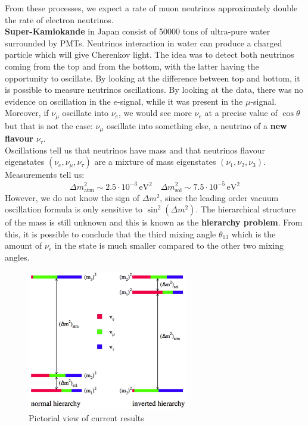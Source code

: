 \documentclass[10.75pt,a4paper,openright,bottom=2cm]{article}
\begin{document}
From these processes, we expect a rate of muon neutrinos approximately double the rate of electron neutrinos.\\
\textbf{Super-Kamiokande} in Japan consist of 50000 tons of ultra-pure water surrounded by PMTs. Neutrinos interaction in water can produce a charged particle which will give Cherenkov light. The idea was to detect both neutrinos coming from the top and from the bottom, with the latter having the opportunity to oscillate. By looking at the difference between top and bottom, it is possible to measure neutrinos oscillations. By looking at the data, there was no evidence on oscillation in the $e$-signal, while it was present in the $\mu$-signal. Moreover, if $\nu_\mu$ oscillate into $\nu_e$, we would see more $\nu_e$ at a precise value of $\cos\theta$ but that is not the case: $\nu_\mu$ oscillate into something else, a neutrino of a \textbf{new flavour} $\nu_\tau$.\\
Oscillations tell us that neutrinos have mass and that neutrinos flavour eigenstates $(\nu_e,\nu_\mu,\nu_\tau)$ are a mixture of mass eigenstates $(\nu_1,\nu_2,\nu_3)$. Measurements tell us:
\[
\Delta m^2_{\text{atm}}\sim2.5\cdot10^{-3}\,\text{eV$^{2}$} \quad \Delta m^2_{\text{sol}}\sim7.5\cdot10^{-5}\,\text{eV$^{2}$}
\]
However, we do not know the sign of $\Delta m^2$, since the leading order vacuum oscillation formula is only sensitive to $\sin^2(\Delta m^2)$.
The hierarchical structure of the mass is still unknown and this is known as the \textbf{hierarchy problem}. From this, it is possible to conclude that the third mixing angle $\theta_{13}$ which is the amount of $\nu_e$ in the  state is much smaller compared to the other two mixing angles.
\begin{figure}[h]
    \centering
    \includegraphics[width=7cm,height=6.125cm]{hierarchy2.jpg}
    \caption{Pictorial view of current results}
    \label{hierarchy}
\end{figure}\\
\end{document}
